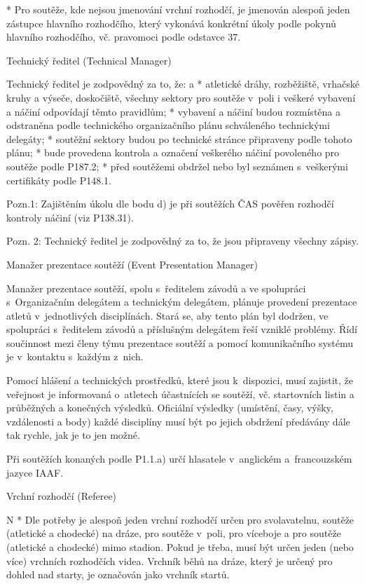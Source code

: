 
* Pro soutěže, kde nejsou jmenování vrchní rozhodčí, je jmenován alespoň jeden zástupce hlavního rozhodčího, který vykonává konkrétní úkoly podle pokynů hlavního rozhodčího, vč. pravomoci podle odstavce 37.
\enditems

\secc Technický ředitel (Technical Manager)

Technický ředitel je zodpovědný za to, že:
\begitems \style a
* atletické dráhy, rozběžiště, vrhačské kruhy a výseče, doskočiště, všechny sektory pro soutěže v~poli i veškeré vybavení a náčiní odpovídají těmto pravidlům;
* vybavení a náčiní budou rozmístěna a odstraněna podle technického organizačního plánu schváleného technickými delegáty;
* soutěžní sektory budou po technické stránce připraveny podle tohoto plánu;
* bude provedena kontrola a označení veškerého náčiní povoleného pro soutěže podle P187.2;
* před soutěžemi obdržel nebo byl seznámen s~veškerými certifikáty podle P148.1.
\enditems

Pozn.1: Zajištěním úkolu dle bodu d) je při soutěžích ČAS pověřen rozhodčí kontroly náčiní (viz P138.31).

Pozn. 2: Technický ředitel je zodpovědný za to, že jsou připraveny všechny zápisy.

\secc Manažer prezentace soutěží (Event Presentation Manager)

Manažer prezentace soutěží, spolu s~ředitelem závodů a ve spolupráci s~Organizačním delegátem a technickým delegátem, plánuje provedení prezentace atletů v~jednotlivých disciplínách.
Stará se, aby tento plán byl dodržen, ve spolupráci s~ředitelem závodů a příslušným delegátem řeší vzniklé problémy.
Řídí součinnost mezi členy týmu prezentace soutěží a pomocí komunikačního systému je v~kontaktu s~každým z~nich.

Pomocí hlášení a technických prostředků, které jsou k~dispozici, musí zajistit, že veřejnost je informovaná o~atletech účastnících se soutěží, vč. startovních listin a průběžných a konečných výsledků.
Oficiální výsledky (umístění, časy, výšky, vzdálenosti a body) každé disciplíny musí být po jejich obdržení předávány dále tak rychle, jak je to jen možné.

Při soutěžích konaných podle P1.1.a) určí hlasatele v~anglickém a~francouzském jazyce IAAF.

\secc Vrchní rozhodčí (Referee)

\begitems \style N
* Dle potřeby je alespoň jeden vrchní rozhodčí určen pro svolavatelnu, soutěže (atletické a chodecké) na dráze, pro soutěže v~poli, pro víceboje a pro soutěže (atletické a chodecké) mimo stadion. Pokud je třeba, musí být určen jeden (nebo více) vrchních rozhodčích videa. Vrchník běhů na dráze, který je určený pro dohled nad starty, je označován jako vrchník startů.


